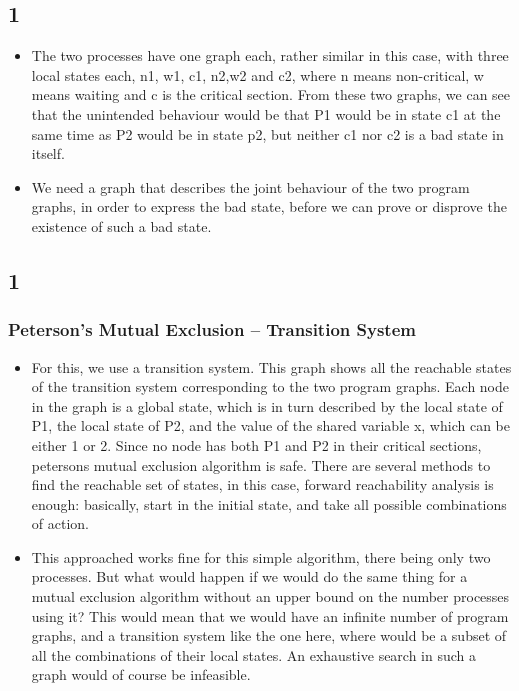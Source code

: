 \documentclass[handout]{beamer}
\begin{document}
\begin{footnotesize}
\subsection*{1}
\begin{frame}
\begin{itemize}
\item
The two processes have one graph each, rather similar in this case, with three local states each, n1, w1, c1, n2,w2 and c2, where n means non-critical, w means waiting and c is the critical section. From these two graphs, we can see that the unintended behaviour would be that P1 would be in state c1 at the same time as P2 would be in state p2, but neither c1 nor c2 is a bad state in itself.
\item
We need a graph that describes the joint behaviour of the two program graphs, in order to express the bad state, before we can prove or disprove the existence of such a bad state.

\end{itemize}
\end{frame}

\subsection*{1}
\begin{frame}
  \frametitle{Peterson's Mutual Exclusion -- Transition System}
\begin{itemize}
\item
For this, we use a transition system. This graph shows all the reachable states of the transition system corresponding to the two program graphs. Each node in the graph is a global state, which is in turn described by the local state of P1, the local state of P2, and the value of the shared variable x, which can be either 1 or 2. Since no node has both P1 and P2 in their critical sections, petersons mutual exclusion algorithm is safe. There are several methods to find the reachable set of states, in this case, forward reachability analysis is enough: basically, start in the initial state, and take all possible combinations of action.
\item
This approached works fine for this simple algorithm, there being only two processes. But what would happen if we would do the same thing for a mutual exclusion algorithm without an upper bound on the number processes using it? This would mean that we would have an infinite number of program graphs, and a transition system like the one here, where would be a subset of all the combinations of their local states. An exhaustive search in such a graph would of course be infeasible.
\end{itemize}
\end{frame}



\end{footnotesize}
\end{document}
